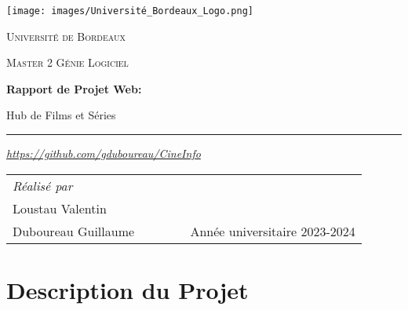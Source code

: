\documentclass[a4paper]{article}
\begin{document}
\begin{titlepage}
    \centering
    
    \vspace*{1.5cm}
    \texttt{[image: images/Université\_Bordeaux\_Logo.png]}\par\vspace{1cm}
    
    {\scshape\LARGE Université de Bordeaux\par}
    \vspace{1cm}
    {\scshape\Large Master 2 Génie Logiciel\par}
    \vspace{3cm}
    {\Large\bfseries Rapport de Projet Web:\par}
    \vspace{1cm}
    {\Huge {Hub de Films et Séries}\par}

    \vspace{1cm}
    \noindent\rule{0.6\textwidth}{0.7pt}
    \vspace{0.5cm}

    \textit{\href{https://github.com/gduboureau/CineInfo}{https://github.com/gduboureau/CineInfo}}


    \vspace{6cm}
    \begin{tabular}{@{}p{0.5\linewidth}p{0.5\linewidth}@{}}
    \raggedright
    {\large\itshape Réalisé par\par}
    \vspace{0.5cm}
    {\Large Ephrem Jennifer\\Loustau Valentin\\Duboureau Guillaume\par}
    &
    \vspace{2cm}
    \raggedleft

    {\large Année universitaire 2023-2024\par}
    \end{tabular}
    
\end{titlepage}

\let\cleardoublepage\clearpage

\vfill
\begin{center}
  \tableofcontents
\end{center}
\vfill
\newpage


\section{Description du Projet}
\end{document}
